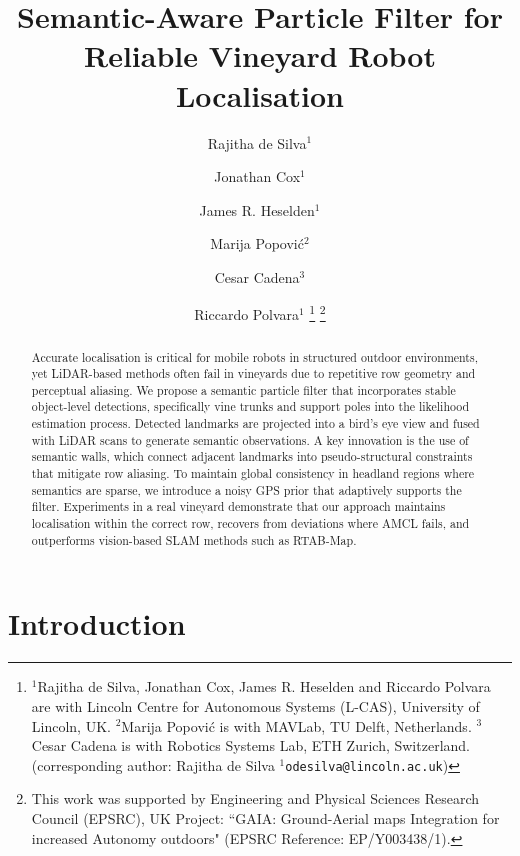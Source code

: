 \documentclass[letterpaper, 10 pt, conference]{ieeeconf}
\title{\LARGE \bf Semantic-Aware Particle Filter for Reliable Vineyard Robot Localisation}
\author{Rajitha de Silva$^{1}$ \and Jonathan Cox$^{1}$ \and James R. Heselden$^{1}$ \and Marija Popovi\'{c}$^{2}$ \and Cesar Cadena$^{3}$ \and Riccardo Polvara$^{1}$%
  \thanks{$^{1}$Rajitha de Silva, Jonathan Cox, James R. Heselden and Riccardo Polvara are with Lincoln Centre for Autonomous Systems (L-CAS), University of Lincoln, UK. $^{2}$Marija Popovi\'{c} is with MAVLab, TU Delft, Netherlands. $^{3}$Cesar Cadena is with Robotics Systems Lab, ETH Zurich, Switzerland. (corresponding author: Rajitha de Silva {\tt\small $^{1}$odesilva@lincoln.ac.uk})}%
  \thanks{This work was supported by Engineering and Physical Sciences Research Council (EPSRC), UK Project: ``GAIA: Ground-Aerial maps Integration for increased Autonomy outdoors" (EPSRC Reference: EP/Y003438/1).}%
}
\begin{document}
\maketitle
\thispagestyle{empty}
\pagestyle{empty}


\begin{abstract}

Accurate localisation is critical for mobile robots in structured outdoor environments, yet LiDAR-based methods often fail in vineyards due to repetitive row geometry and perceptual aliasing. We propose a semantic particle filter that incorporates stable object-level detections, specifically vine trunks and support poles into the likelihood estimation process. Detected landmarks are projected into a bird’s eye view and fused with LiDAR scans to generate semantic observations. A key innovation is the use of semantic walls, which connect adjacent landmarks into pseudo-structural constraints that mitigate row aliasing. To maintain global consistency in headland regions where semantics are sparse, we introduce a noisy GPS prior that adaptively supports the filter. Experiments in a real vineyard demonstrate that our approach maintains localisation within the correct row, recovers from deviations where AMCL fails, and outperforms vision-based SLAM methods such as RTAB-Map.

  

\end{abstract}


\section{Introduction}
\label{sec:intro}
\end{document}
